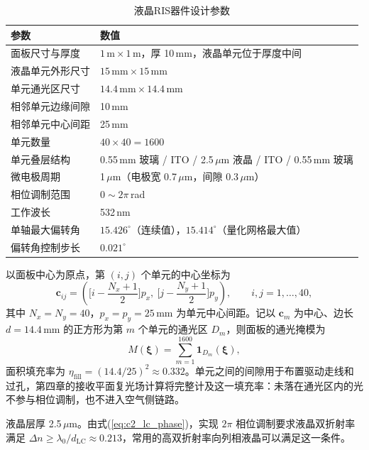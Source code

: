 \begin{table}[htbp]
\caption{液晶RIS器件设计参数}
\label{tab:c3_device}
\centering
\begin{tabular}{ll}
\toprule
参数 & 数值 \\
\midrule
面板尺寸与厚度 & $1\,\mathrm{m}\times1\,\mathrm{m}$，厚 10\,mm，液晶单元位于厚度中间 \\
液晶单元外形尺寸 & $15\,\mathrm{mm}\times15\,\mathrm{mm}$ \\
单元通光区尺寸 & $14.4\,\mathrm{mm}\times14.4\,\mathrm{mm}$ \\
相邻单元边缘间隙 & 10\,mm \\
相邻单元中心间距 & 25\,mm \\
单元数量 & $40\times40=1600$ \\
单元叠层结构 & 0.55\,mm 玻璃 / ITO / 2.5\,$\mu$m 液晶 / ITO / 0.55\,mm 玻璃 \\
微电极周期 & 1\,$\mu$m（电极宽 0.7\,$\mu$m，间隙 0.3\,$\mu$m） \\
相位调制范围 & $0\sim2\pi$\,rad \\
工作波长 & 532\,nm \\
单轴最大偏转角 & $15.426^\circ$（连续值），$15.414^\circ$（量化网格最大值） \\
偏转角控制步长 & $0.021^\circ$ \\
\bottomrule
\end{tabular}
\end{table}

以面板中心为原点，第 $(i,j)$ 个单元的中心坐标为
\begin{equation}
\mathbf c_{ij}=\left(\Big[i-\frac{N_x+1}{2}\Big]p_x,\ \Big[j-\frac{N_y+1}{2}\Big]p_y\right),\qquad i,j=1,\ldots,40,
\label{eq:c3_centers}
\end{equation}
其中 $N_x=N_y=40$，$p_x=p_y=25\,\mathrm{mm}$ 为单元中心间距。记以 $\mathbf c_m$ 为中心、边长 $d=14.4\,\mathrm{mm}$ 的正方形为第 $m$ 个单元的通光区 $D_m$，则面板的通光掩模为
\begin{equation}
M(\boldsymbol\xi)=\sum_{m=1}^{1600}\mathbf 1_{D_m}(\boldsymbol\xi),
\label{eq:c3_mask}
\end{equation}
面积填充率为 $\eta_{\mathrm{fill}}=(14.4/25)^2\approx0.332$。单元之间的间隙用于布置驱动走线和过孔，第四章的接收平面复光场计算将完整计及这一填充率：未落在通光区内的光不参与相位调制，也不进入空气侧链路。

液晶层厚 2.5\,$\mu$m。由式(\ref{eq:c2_lc_phase})，实现 $2\pi$ 相位调制要求液晶双折射率满足 $\Delta n\ge\lambda_0/d_{\mathrm{LC}}\approx0.213$，常用的高双折射率向列相液晶可以满足这一条件。

